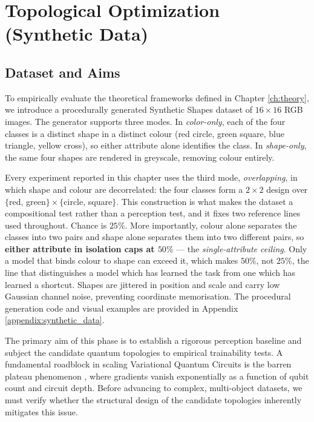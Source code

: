 \documentclass[12pt, a4paper, oneside]{report}
\begin{document}
\chapter{Topological Optimization (Synthetic Data)}
\label{ch:synthetic}

\section{Dataset and Aims}

To empirically evaluate the theoretical frameworks defined in Chapter \ref{ch:theory}, we introduce a procedurally generated Synthetic Shapes dataset of $16 \times 16$ RGB images. The generator supports three modes. In \textit{color-only}, each of the four classes is a distinct shape in a distinct colour (red circle, green square, blue triangle, yellow cross), so either attribute alone identifies the class. In \textit{shape-only}, the same four shapes are rendered in greyscale, removing colour entirely.

Every experiment reported in this chapter uses the third mode, \textit{overlapping}, in which shape and colour are decorrelated: the four classes form a $2 \times 2$ design over $\{$red, green$\}\times\{$circle, square$\}$. This construction is what makes the dataset a compositional test rather than a perception test, and it fixes two reference lines used throughout. Chance is $25\%$. More importantly, colour alone separates the classes into two pairs and shape alone separates them into two different pairs, so \textbf{either attribute in isolation caps at $50\%$} --- the \textit{single-attribute ceiling}. Only a model that binds colour to shape can exceed it, which makes $50\%$, not $25\%$, the line that distinguishes a model which has learned the task from one which has learned a shortcut. Shapes are jittered in position and scale and carry low Gaussian channel noise, preventing coordinate memorisation. The procedural generation code and visual examples are provided in Appendix \ref{appendix:synthetic_data}.

The primary aim of this phase is to establish a rigorous perception baseline and subject the candidate quantum topologies to empirical trainability tests. A fundamental roadblock in scaling Variational Quantum Circuits is the barren plateau phenomenon \cite{barren_plateaus}, where gradients vanish exponentially as a function of qubit count and circuit depth. Before advancing to complex, multi-object datasets, we must verify whether the structural design of the candidate topologies inherently mitigates this issue. 
\end{document}
